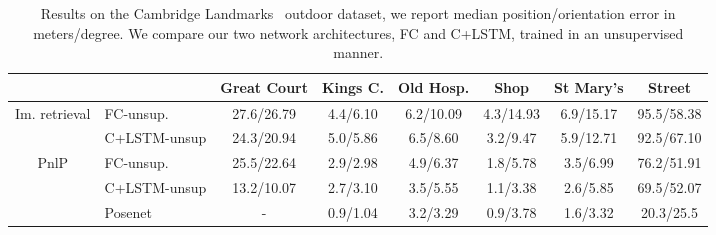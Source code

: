 \begin{table}
	\centering
	\begin{scriptsize}
	\begin{tabular}{c l | c c c c c c }
					&	&	Great Court	&	Kings C.	&	Old Hosp.	&	Shop &	St Mary's &	Street \\
		\hline	
	\multirow{2}{*}{{Im. retrieval}}
	& FC-unsup.  	& 27.6/26.79 & 4.4/6.10 & 6.2/10.09 & 4.3/14.93	& 6.9/15.17 & 95.5/58.38 \\
	& C+LSTM-unsup 	& 24.3/20.94 & 5.0/5.86 & 6.5/8.60	& 3.2/9.47  & 5.9/12.71	& 92.5/67.10 \\
	\multirow{2}{*}{{PnlP}}
	& FC-unsup. 	& 25.5/22.64 & 2.9/2.98 & 4.9/6.37 & 1.8/5.78 & 3.5/6.99 & 76.2/51.91 \\
	& C+LSTM-unsup 	& 13.2/10.07 & 2.7/3.10	& 3.5/5.55 & 1.1/3.38 & 2.6/5.85 & 69.5/52.07 \\[1pt]
	\hline
	& {Posenet~\citep{Kendall2017}} & - & 0.9/1.04 & 3.2/3.29 & 0.9/3.78 & 1.6/3.32 & 20.3/25.5 \\
	\end{tabular}
	\end{scriptsize}
	\caption[Pose refinement results on outdoor dataset]{\label{tab:outdoor} Results on the Cambridge Landmarks~\citep{Kendall2015} outdoor dataset, we report median position/orientation error in meters/degree. We compare our two network architectures, FC and C+LSTM, trained in an unsupervised manner.}
\end{table}
